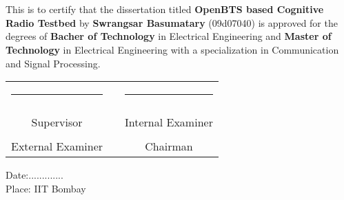 \chapter*{}

This is to certify that the dissertation titled \textbf{OpenBTS based 
Cognitive Radio Testbed} by \textbf{Swrangsar Basumatary} (09d07040) is
approved for the degrees of \textbf{Bacher of Technology} in Electrical
Engineering and \textbf{Master of Technology} in Electrical Engineering with
a specialization in Communication and Signal Processing.

\vspace{1.7cm}

\begin{center}
\begin{tabular}{ccc}
\rule{60mm}{0pt}        & \rule{10mm}{0pt}       & \rule{60mm}{0pt} \\
\dotfill                &                        & \dotfill \\
Supervisor              &                        & Internal Examiner \vspace{1.3cm} \\
\dotfill                &                        & \dotfill \\
External Examiner       &                        & Chairman \vspace{1.3cm} \\
\end{tabular}    
\end{center}

\vspace{1cm}

Date:............. \\
Place: IIT Bombay
